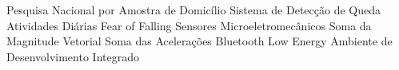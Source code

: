 \begin{acronym}[ACRONYM] 

 { Pesquisa Nacional por Amostra de Domicílio }
 {Sistema de Detecção de Queda}
 {Atividades Diárias}
 {Fear of Falling}
 { Sensores Microeletromecânicos }
 {Soma da Magnitude Vetorial }
 {Soma das Acelerações}
 {Bluetooth Low Energy}
 {Ambiente de Desenvolvimento Integrado}

    
\end{acronym}